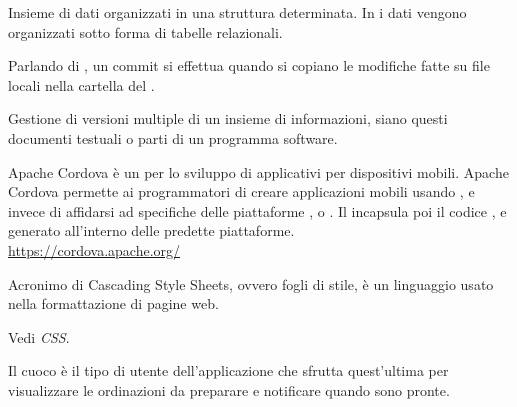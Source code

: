 Insieme di dati organizzati in una struttura determinata. In  i dati vengono organizzati sotto forma di tabelle relazionali.

Parlando di , un commit si effettua quando si copiano le modifiche fatte su file locali nella cartella del .

Gestione di versioni multiple di un insieme di informazioni, siano questi documenti testuali o parti di un programma software.

Apache Cordova è un  per lo sviluppo di applicativi per dispositivi mobili. Apache Cordova permette ai programmatori di creare applicazioni mobili usando ,  e  invece di affidarsi ad  specifiche delle piattaforme ,  o . Il  incapsula poi il codice ,  e  generato all'interno delle predette piattaforme.\\
\url{https://cordova.apache.org/}

Acronimo di Cascading Style Sheets, ovvero fogli di stile, è un linguaggio usato nella formattazione di pagine web.

Vedi \textit{CSS}.

Il cuoco è il tipo di utente dell’applicazione che sfrutta quest’ultima per visualizzare le ordinazioni da preparare e notificare quando sono pronte.
\clearpage
